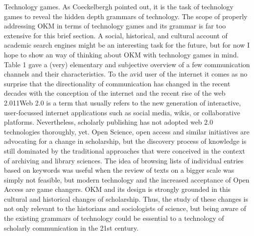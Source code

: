 Technology games. As Coeckelbergh pointed out, it is the task of
technology games to reveal the hidden depth grammars of technology. The
scope of properly addressing OKM in terms of technology games and its
grammar is far too extensive for this brief section. A social,
historical, and cultural account of academic search engines might be an
interesting task for the future, but for now I hope to show an way of
thinking about OKM with technology games in mind. Table 1 gave a (very)
elementary and subjective overview of a few communication channels and
their characteristics. To the avid user of the internet it comes as no
surprise that the directionality of communication has changed in the
recent decades with the conception of the internet and the recent rise
of the web 2.011Web 2.0 is a term that usually refers to the new
generation of interactive, user-focussed internet applications such as
social media, wikis, or collaborative platforms. Nevertheless,
scholarly publishing has not adopted web 2.0 technologies thoroughly,
yet. Open Science, open access and similar initiatives are advocating
for a change in scholarship, but the discovery process of knowledge is
still dominated by the traditional approaches that were conceived in the
context of archiving and library sciences. The idea of browsing lists of
individual entries based on keywords was useful when the review of texts
on a bigger scale was simply not feasible, but modern technology and the
increased acceptance of Open Access are game changers. OKM and its
design is strongly grounded in this cultural and historical changes of
scholarship. Thus, the study of these changes is not only relevant to
the historians and sociologists of science, but being aware of the
existing grammars of technology could be essential to a technology of
scholarly communication in the 21st century.